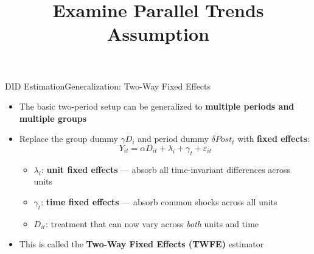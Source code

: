 \documentclass[dvipsnames,hyperref={pdfpagelabels=false}]{beamer}
\begin{document}
\begin{frame}{DID Estimation}{Generalization: Two-Way Fixed Effects}
\begin{itemize}
    \item The basic two-period setup can be generalized to \textbf{multiple periods and multiple groups}
    \vspace{0.2cm}
    \item Replace the group dummy $\gamma D_i$ and period dummy $\delta Post_t$ with \textbf{fixed effects}:
    \[
        Y_{it} = \alpha D_{it} + \lambda_i + \gamma_t + \varepsilon_{it}
    \]
    \vspace{0.1cm}
    \begin{itemize}
        \item $\lambda_i$: \textbf{unit fixed effects} --- absorb all time-invariant differences across units
        \vspace{0.2cm}
        \item $\gamma_t$: \textbf{time fixed effects} --- absorb common shocks across all units
        \vspace{0.2cm}
        \item $D_{it}$: treatment that can now vary across \emph{both} units and time
    \end{itemize}
    \vspace{0.2cm}
    \item This is called the \textbf{Two-Way Fixed Effects (TWFE)} estimator
\end{itemize}


\end{frame}





\title[]  
{Examine Parallel Trends Assumption}


\author 
{}

\institute{}
\end{document}
